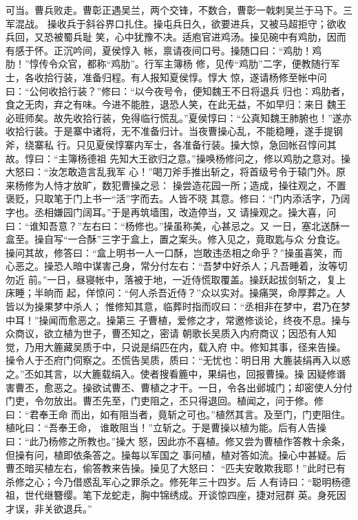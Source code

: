 可当。曹兵败走。曹彰正遇吴兰，两个交锋，不数合，曹彰一戟刺吴兰于马下。三军混战。
操收兵于斜谷界口扎住。操屯兵日久，欲要进兵，又被马超拒守；欲收兵回，又恐被蜀兵耻
笑，心中犹豫不决。适庖官进鸡汤。操见碗中有鸡肋，因而有感于怀。正沉吟间，夏侯惇入
帐，禀请夜间口号。操随口曰：“鸡肋！鸡肋！”惇传令众官，都称“鸡肋”。行军主簿杨
修，见传“鸡肋”二字，便教随行军士，各收拾行装，准备归程。有人报知夏侯惇。惇大
惊，遂请杨修至帐中问曰：“公何收拾行装？”修曰：“以今夜号令，便知魏王不日将退兵
归也：鸡肋者，食之无肉，弃之有味。今进不能胜，退恐人笑，在此无益，不如早归：来日
魏王必班师矣。故先收拾行装，免得临行慌乱。”夏侯惇曰：“公真知魏王肺腑也！”遂亦
收拾行装。于是寨中诸将，无不准备归计。当夜曹操心乱，不能稳睡，遂手提钢斧，绕寨私
行。只见夏侯惇寨内军士，各准备行装。操大惊，急回帐召惇问其故。惇曰：“主簿杨德祖
先知大王欲归之意。”操唤杨修问之，修以鸡肋之意对。操大怒曰：“汝怎敢造言乱我军
心！”喝刀斧手推出斩之，将首级号令于辕门外。原来杨修为人恃才放旷，数犯曹操之忌：
操尝造花园一所；造成，操往观之，不置褒贬，只取笔于门上书一“活”字而去。人皆不晓
其意。修曰：“门内添活字，乃阔字也。丞相嫌园门阔耳。”于是再筑墙围，改造停当，又
请操观之。操大喜，问曰：“谁知吾意？”左右曰：“杨修也。”操虽称美，心甚忌之。又
一日，塞北送酥一盒至。操自写“一合酥”三字于盒上，置之案头。修入见之，竟取匙与众
分食讫。操问其故，修答曰：“盒上明书一人一口酥，岂敢违丞相之命乎？”操虽喜笑，而
心恶之。操恐人暗中谋害己身，常分付左右：“吾梦中好杀人；凡吾睡着，汝等切勿近
前。”一日，昼寝帐中，落被于地，一近侍慌取覆盖。操跃起拔剑斩之，复上床睡；半晌而
起，佯惊问：“何人杀吾近侍？”众以实对。操痛哭，命厚葬之。人皆以为操果梦中杀人；
惟修知其意，临葬时指而叹曰：“丞相非在梦中，君乃在梦中耳！”操闻而愈恶之。操第三
子曹植，爱修之才，常邀修谈论，终夜不息。操与众商议，欲立植为世子，曹丕知之，密请
朝歌长吴质入内府商议；因恐有人知觉，乃用大簏藏吴质于中，只说是绢匹在内，载入府
中。修知其事，径来告操。操令人于丕府门伺察之。丕慌告吴质，质曰：“无忧也：明日用
大簏装绢再入以惑之。”丕如其言，以大簏载绢入。使者搜看簏中，果绢也，回报曹操。操
因疑修谮害曹丕，愈恶之。操欲试曹丕、曹植之才干。一日，令各出邺城门；却密使人分付
门吏，令勿放出。曹丕先至，门吏阻之，丕只得退回。植闻之，问于修。修曰：“君奉王命
而出，如有阻当者，竟斩之可也。”植然其言。及至门，门吏阻住。植叱曰：“吾奉王命，
谁敢阻当！”立斩之。于是曹操以植为能。后有人告操曰：“此乃杨修之所教也。”操大
怒，因此亦不喜植。修又尝为曹植作答教十余条，但操有问，植即依条答之。操每以军国之
事问植，植对答如流。操心中甚疑。后曹丕暗买植左右，偷答教来告操。操见了大怒曰：
“匹夫安敢欺我耶！”此时已有杀修之心；今乃借惑乱军心之罪杀之。修死年三十四岁。后
人有诗曰：“聪明杨德祖，世代继簪缨。笔下龙蛇走，胸中锦绣成。开谈惊四座，捷对冠群
英。身死因才误，非关欲退兵。”

